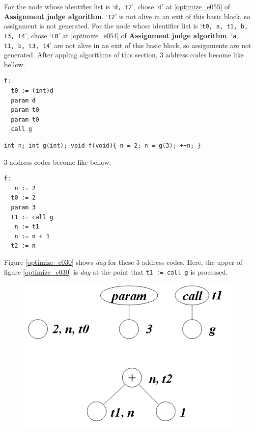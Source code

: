 \begin{Example}
For the node whose identifier list is `{\tt{d, t2}}',
chose `{\tt{d}}' at \ref{optimize_e055} of {\bf Assignment judge
 algorithm}.
`{\tt{t2}}' is not alive in an exit of this basic block, so
assignment is not generated.
For the node whose identifier list is `{\tt{t0, a, t1, b, t3, t4}}',
chose `{\tt{t0}}' at \ref{optimize_e054} of {\bf Assignment judge
 algorithm}.
`{\tt{a, t1, b, t3, t4}}' are not alive in an exit of this basic block, so
assignments are not generated.
After appling algorithms of this section,
3 address codes become like bellow.
\begin{verbatim}
f:
  t0 := (int)d
  param d
  param t0
  param t0
  call g
\end{verbatim}
\end{Example}

\begin{Example}
\label{optimize_e029}
\begin{verbatim}
int n; int g(int); void f(void){ n = 2; n = g(3); ++n; }
\end{verbatim}
3 address codes become like bellow.
\begin{verbatim}
f:
   n := 2
  t0 := 2
  param 3
  t1 := call g
   n := t1
   n := n + 1
  t2 := n
\end{verbatim}
Figure \ref{optimize_e030} shows {\em dag} for these 3 address codes.
Here, the upper of figure \ref{optimize_e030} is {\em dag}
at the point that {\tt{t1 := call g}} is processed.
\begin{figure}[htbp]
\begin{center}
\begin{htmlonly}
\includegraphics[width=0.8\linewidth,height=0.571\linewidth]{opt013.png}
\end{htmlonly}
\begin{latexonly}

\end{latexonly}
\end{center}
\end{figure}
\end{Example}
